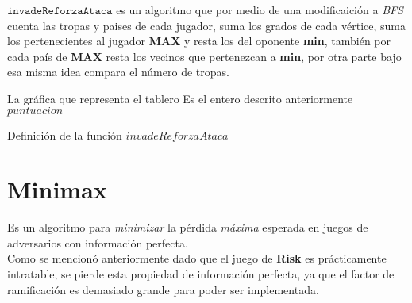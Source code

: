 \documentclass[12pt]{article}
\begin{document}
$\mathtt{invadeReforzaAtaca}$ es un algoritmo que por medio de una modificaici\'on a \textit{BFS} cuenta
las tropas y paises de cada jugador, suma los grados de cada v\'ertice, suma los pertenecientes al jugador \textbf{MAX} 
y resta los del oponente \textbf{min}, tambi\'en por cada pa\'is de \textbf{MAX} resta los vecinos que pertenezcan 
a \textbf{min}, por otra parte bajo esa misma idea compara el n\'umero de tropas.\\

\begin{algorithm}
\begin{algorithmic}[1]
\REQUIRE La gr\'afica que representa el tablero
\ENSURE Es el entero descrito anteriormente
\ENDFOR
{}
\ENDIF
{}
\ENDIF
{}
\ENDIF
{}
\ENDIF
{}
\ENDIF
{}
\ENDIF
{}
\ENDIF
{}
\ENDIF
\ENDFOR
\ENDWHILE
\RETURN $puntuacion$
\end{algorithmic}
\caption{Definici\'on de la funci\'on $invadeReforzaAtaca$}
\label{invadeReforzaAtaca}
\end{algorithm}

\section{Minimax}

Es un algoritmo para \textit{minimizar} la p\'erdida \textit{m\'axima} esperada en juegos de adversarios con
informaci\'on perfecta.\\

Como se mencion\'o anteriormente dado que el juego de \textbf{Risk} es pr\'acticamente intratable, se pierde esta propiedad
de informaci\'on perfecta, ya que el factor de ramificaci\'on es demasiado grande para poder ser implementada.\\
\end{document}

